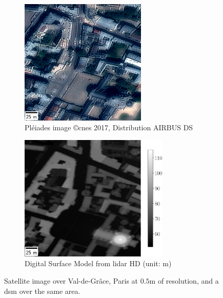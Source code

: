 \begin{figure}
    \centering
    \begin{subfigure}[t]{0.5\linewidth}
        \centering
        \includegraphics[height=6cm]{Images/0_Intro/Paris_Ortho.png}
        \caption{Pléiades image \copyright \acrshort{cnes} 2017, Distribution AIRBUS DS}
        \label{fig:VDG_ortho}
    \end{subfigure}\hfill
    \begin{subfigure}[t]{0.5\linewidth}
        \centering
        \includegraphics[height=6cm]{Images/0_Intro/Paris_DSM.png}
        \caption{Digital Surface Model from \acrshort{lidar} HD (unit: m)}
        \label{fig:VDG_dsm}
    \end{subfigure}
    \caption{Satellite image over Val-de-Grâce, Paris at $0.5$m of resolution, and a \acrshort{dsm} over the same area.}
    \label{fig:intro_dsm_example}
\end{figure}

